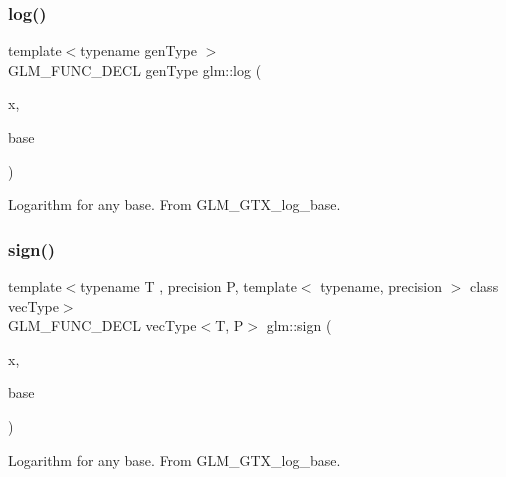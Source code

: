 \subsubsection{\texorpdfstring{log()}{log()}}
{\footnotesize\ttfamily template$<$typename gen\+Type $>$ \\
G\+L\+M\+\_\+\+F\+U\+N\+C\+\_\+\+D\+E\+CL gen\+Type glm\+::log (\begin{DoxyParamCaption}\item[{gen\+Type const \&}]{x,  }\item[{gen\+Type const \&}]{base }\end{DoxyParamCaption})}

Logarithm for any base. From G\+L\+M\+\_\+\+G\+T\+X\+\_\+log\+\_\+base. \mbox{\label{group__gtx__log__base_ga1842004a127a9f3573764362ff639191}} 
\subsubsection{\texorpdfstring{sign()}{sign()}}
{\footnotesize\ttfamily template$<$typename T , precision P, template$<$ typename, precision $>$ class vec\+Type$>$ \\
G\+L\+M\+\_\+\+F\+U\+N\+C\+\_\+\+D\+E\+CL vec\+Type$<$T, P$>$ glm\+::sign (\begin{DoxyParamCaption}\item[{vec\+Type$<$ T, P $>$ const \&}]{x,  }\item[{vec\+Type$<$ T, P $>$ const \&}]{base }\end{DoxyParamCaption})}

Logarithm for any base. From G\+L\+M\+\_\+\+G\+T\+X\+\_\+log\+\_\+base. 